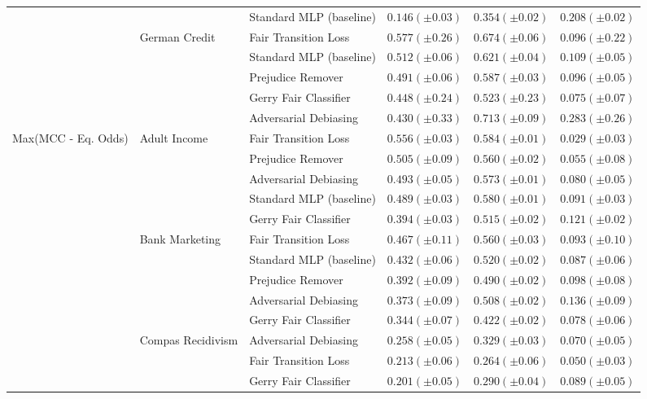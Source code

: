 \begin{tabular}{llllll}
 &  & Standard MLP (baseline) & $0.146 (\pm0.03)$ & $0.354 (\pm0.02)$ & $0.208 (\pm0.02)$ \\
\cline{2-6}
 & \multirow[t]{5}{*}{German Credit} & Fair Transition Loss & $0.577 (\pm0.26)$ & $0.674 (\pm0.06)$ & $0.096 (\pm0.22)$ \\
 &  & Standard MLP (baseline) & $0.512 (\pm0.06)$ & $0.621 (\pm0.04)$ & $0.109 (\pm0.05)$ \\
 &  & Prejudice Remover & $0.491 (\pm0.06)$ & $0.587 (\pm0.03)$ & $0.096 (\pm0.05)$ \\
 &  & Gerry Fair Classifier & $0.448 (\pm0.24)$ & $0.523 (\pm0.23)$ & $0.075 (\pm0.07)$ \\
 &  & Adversarial Debiasing & $0.430 (\pm0.33)$ & $0.713 (\pm0.09)$ & $0.283 (\pm0.26)$ \\
\cline{1-6} \cline{2-6}
\multirow[t]{20}{*}{Max(MCC - Eq. Odds)} & \multirow[t]{5}{*}{Adult Income} & Fair Transition Loss & $0.556 (\pm0.03)$ & $0.584 (\pm0.01)$ & $0.029 (\pm0.03)$ \\
 &  & Prejudice Remover & $0.505 (\pm0.09)$ & $0.560 (\pm0.02)$ & $0.055 (\pm0.08)$ \\
 &  & Adversarial Debiasing & $0.493 (\pm0.05)$ & $0.573 (\pm0.01)$ & $0.080 (\pm0.05)$ \\
 &  & Standard MLP (baseline) & $0.489 (\pm0.03)$ & $0.580 (\pm0.01)$ & $0.091 (\pm0.03)$ \\
 &  & Gerry Fair Classifier & $0.394 (\pm0.03)$ & $0.515 (\pm0.02)$ & $0.121 (\pm0.02)$ \\
\cline{2-6}
 & \multirow[t]{5}{*}{Bank Marketing} & Fair Transition Loss & $0.467 (\pm0.11)$ & $0.560 (\pm0.03)$ & $0.093 (\pm0.10)$ \\
 &  & Standard MLP (baseline) & $0.432 (\pm0.06)$ & $0.520 (\pm0.02)$ & $0.087 (\pm0.06)$ \\
 &  & Prejudice Remover & $0.392 (\pm0.09)$ & $0.490 (\pm0.02)$ & $0.098 (\pm0.08)$ \\
 &  & Adversarial Debiasing & $0.373 (\pm0.09)$ & $0.508 (\pm0.02)$ & $0.136 (\pm0.09)$ \\
 &  & Gerry Fair Classifier & $0.344 (\pm0.07)$ & $0.422 (\pm0.02)$ & $0.078 (\pm0.06)$ \\
\cline{2-6}
 & \multirow[t]{5}{*}{Compas Recidivism} & Adversarial Debiasing & $0.258 (\pm0.05)$ & $0.329 (\pm0.03)$ & $0.070 (\pm0.05)$ \\
 &  & Fair Transition Loss & $0.213 (\pm0.06)$ & $0.264 (\pm0.06)$ & $0.050 (\pm0.03)$ \\
 &  & Gerry Fair Classifier & $0.201 (\pm0.05)$ & $0.290 (\pm0.04)$ & $0.089 (\pm0.05)$ \\

\end{tabular}
